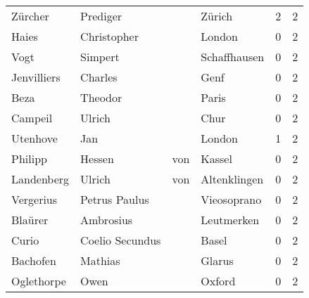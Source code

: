 \begin{tabular}{llllrr}
                  Zürcher &                           Prediger &             &                                      Zürich &          2 &         2 \\
                    Haies &                        Christopher &             &                                      London &          0 &         2 \\
                     Vogt &                            Simpert &             &                                Schaffhausen &          0 &         2 \\
              Jenvilliers &                            Charles &             &                                        Genf &          0 &         2 \\
                     Beza &                            Theodor &             &                                       Paris &          0 &         2 \\
                  Campeil &                             Ulrich &             &                                        Chur &          0 &         2 \\
                 Utenhove &                                Jan &             &                                      London &          1 &         2 \\
                  Philipp &                             Hessen &         von &                                      Kassel &          0 &         2 \\
               Landenberg &                             Ulrich &         von &                                Altenklingen &          0 &         2 \\
                Vergerius &                      Petrus Paulus &             &                                 Vieosoprano &          0 &         2 \\
                  Blaürer &                          Ambrosius &             &                                  Leutmerken &          0 &         2 \\
                    Curio &                    Coelio Secundus &             &                                       Basel &          0 &         2 \\
                 Bachofen &                            Mathias &             &                                      Glarus &          0 &         2 \\
               Oglethorpe &                               Owen &             &                                      Oxford &          0 &         2 \\

\end{tabular}

